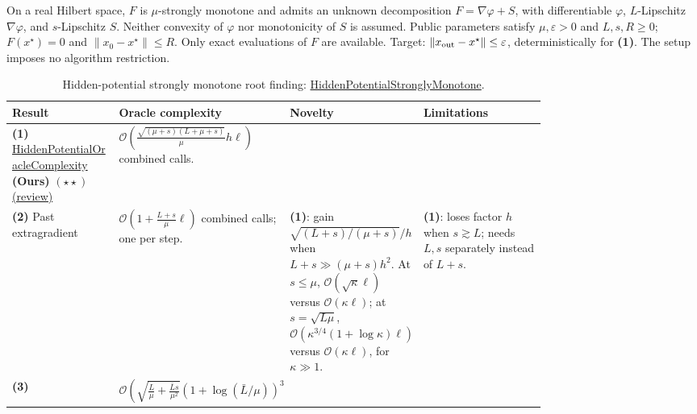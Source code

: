 \begin{table}[tp]
\centering
\caption{Hidden-potential strongly monotone root finding: \href{https://github.com/k3nfalt/longtails/blob/main/LongTails/Setups/HiddenPotentialStronglyMonotone.lean}{HiddenPotentialStronglyMonotone}.}\label{tab:HiddenPotentialStronglyMonotone}
\parbox{\linewidth}{\footnotesize On a real Hilbert space, $F$ is $\mu$-strongly monotone and admits an unknown decomposition $F=\nabla\varphi+S$, with differentiable $\varphi$, $L$-Lipschitz $\nabla\varphi$, and $s$-Lipschitz $S$. Neither convexity of $\varphi$ nor monotonicity of $S$ is assumed. Public parameters satisfy $\mu,\varepsilon>0$ and $L,s,R\ge0$; $F(x^\star)=0$ and $\|x_0-x^\star\|\le R$. Only exact evaluations of $F$ are available. Target: $\|x_{\rm out}-x^\star\|\le\varepsilon$, deterministically for \textbf{(1)}. The setup imposes no algorithm restriction.}\par\smallskip
\begin{threeparttable}
\footnotesize
\setlength{\tabcolsep}{4pt}\renewcommand{\arraystretch}{1.25}
\begin{tabularx}{\linewidth}{@{}>{\raggedright\arraybackslash}p{0.20\linewidth}>{\raggedright\arraybackslash}p{0.32\linewidth}>{\raggedright\arraybackslash}p{0.25\linewidth}>{\raggedright\arraybackslash}X@{}}
\toprule
\textbf{Result} & \textbf{Oracle complexity} & \textbf{Novelty} & \textbf{Limitations} \\
\midrule
\textbf{(1)} \href{https://github.com/k3nfalt/longtails/blob/main/LongTails/Theorems/HiddenPotentialOracleComplexity.lean}{Hidden\allowbreak Potential\allowbreak Oracle\allowbreak Complexity} \textbf{(Ours)} $(\star\star)$ \href{https://github.com/k3nfalt/longtails/blob/main/scripts/reviews/HiddenPotentialOracleComplexity.md}{(review)}
& $\displaystyle\mathcal{O}\!\left(\frac{\sqrt{(\mu+s)(L+\mu+s)}}{\mu}h\ell\right)$ combined calls.
& & \\
\midrule[1.2pt]
\textbf{(2)} Past extragradient \citep[Thm.~1]{hpGidel2020v5}
& $\displaystyle\mathcal{O}\!\left(1+\frac{L+s}{\mu}\ell\right)$ combined calls; one per step.
& \textbf{(1)}: gain $\sqrt{(L+s)/(\mu+s)}/h$ when $L+s\gg(\mu+s)h^2$. At $s\le\mu$, $\mathcal{O}(\sqrt\kappa\ell)$ versus $\mathcal{O}(\kappa\ell)$; at $s=\sqrt{L\mu}$, $\mathcal{O}(\kappa^{3/4}(1+\log\kappa)\ell)$ versus $\mathcal{O}(\kappa\ell)$, for $\kappa\gg1$.
& \textbf{(1)}: loses factor $h$ when $s\gtrsim L$; needs $L,s$ separately instead of $L+s$. \\
\midrule
\textbf{(3)} \citep[Thm.~3]{hpWangLi2020v2}
& $\displaystyle\mathcal{O}\!\left(\sqrt{\frac L\mu+\frac{\bar Ls}{\mu^2}}(1+\log(\bar L/\mu))^3\right.$\newline

\end{tabularx}
\end{threeparttable}
\end{table}
